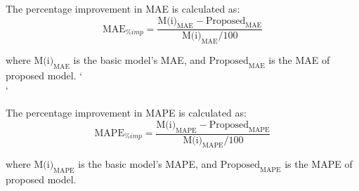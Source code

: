 \documentclass[a4paper, fleqn]{cas-sc}
\begin{document}
The percentage improvement in MAE is calculated as:
\begin{equation}
    \text{MAE}_{\%imp} = \frac{\text{M(i)}_{\text{MAE}} - \text{Proposed}_{\text{MAE}}}{\text{M(i)}_{\text{MAE}}/100}
\end{equation}

where $\text{M(i)}_{\text{MAE}}$ is the basic model's MAE,  and $\text{Proposed}_{\text{MAE}}$ is the MAE of proposed model. `\\`

The percentage improvement in MAPE is calculated as:
\begin{equation}
   \text{MAPE}_{\%imp} = \frac{\text{M(i)}_{\text{MAPE}} - \text{Proposed}_{\text{MAPE}}}{\text{M(i)}_{\text{MAPE}}/100}
\end{equation}

where $\text{M(i)}_{\text{MAPE}}$ is the basic model's MAPE,  and $\text{Proposed}_{\text{MAPE}}$ is the MAPE of proposed model.









\end{document}
